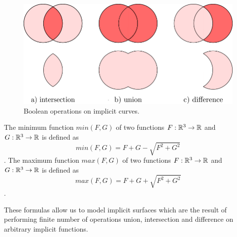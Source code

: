 \begin{figure}
    \centerline{\includegraphics[scale=0.5]{images/img19}}
    \caption[Boolean operations on implicit curves]
    {Boolean operations on implicit curves.}
    \label{img:19}
\end{figure}

\begin{theorem}
    The minimum function $min(F, G)$ of two functions $F:\mathbb{R}^3 \to \mathbb{R}$ and
    $G:\mathbb{R}^3 \to \mathbb{R}$ is defined as $$min(F, G) = F + G - \sqrt{F^2+G^2}$$.
    The maximum function $max(F, G)$ of two functions $F:\mathbb{R}^3 \to \mathbb{R}$ and
    $G:\mathbb{R}^3 \to \mathbb{R}$ is defined as $$max(F, G) = F + G + \sqrt{F^2+G^2}$$.
\end{theorem}

These formulas allow us to model implicit surfaces which are the result of
performing finite number of operations union, intersection and difference
on arbitrary implicit functions.

